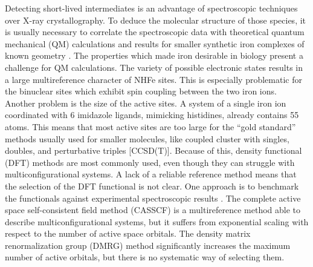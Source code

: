 Detecting short-lived intermediates is an advantage of spectroscopic techniques over X-ray crystallography. To deduce the molecular structure of those species, it is usually necessary to correlate the spectroscopic data with theoretical quantum mechanical (QM) calculations and results for smaller synthetic iron complexes of known geometry \cite{Rokob2016}. The properties which made iron desirable in biology present a challenge for QM calculations. The variety of possible electronic states results in a large multireference character of NHFe sites. This is especially problematic for the binuclear sites which exhibit spin coupling between the two iron ions. Another problem is the size of the active sites. A system of a single iron ion coordinated with 6 imidazole ligands, mimicking histidines, already contains 55 atoms. This means that most active sites are too large for the ``gold standard'' methods usually used for smaller molecules, like coupled cluster with singles, doubles, and perturbative triples [CCSD(T)]. Because of this, density functional (DFT) methods are most commonly used, even though they can struggle with multiconfigurational systems. A lack of a reliable reference method means that the selection of the DFT functional is not clear. One approach is to benchmark the functionals against experimental spectroscopic results \cite{Rokob2016}. The complete active space self-consistent field method (CASSCF) is a multireference method able to describe multiconfigurational systems, but it suffers from exponential scaling with respect to the number of active space orbitals. The density matrix renormalization group (DMRG) method significantly increases the maximum number of active orbitals, but there is no systematic way of selecting them. 

